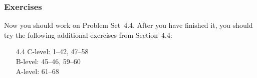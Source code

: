 \documentclass[serif,ignorenonframetext]{beamer}
\begin{document}
\begin{frame}
  \frametitle{Exercises}
  Now you should work on Problem Set~4.4.  After you have finished it,
  you should try the following additional exercises from Section~4.4:
  \begin{itemize}
  \item[4.4]
    C-level: 1--42, 47--58 \\
    B-level: 45--46, 59--60 \\
    A-level: 61--68
  \end{itemize}
\end{frame}
\end{document}
